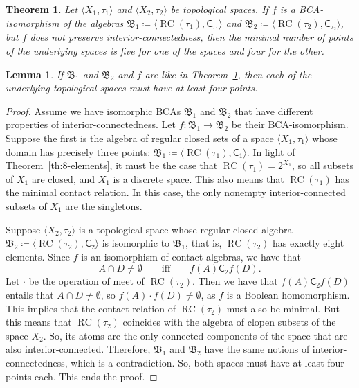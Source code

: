 \documentclass[10pt,a4paper]{amsart}
\newtheorem{theorem}{Theorem}
\newtheorem{lemma}{Lemma}
\DeclareMathOperator{\RCvtex}{RC}
\begin{document}
\begin{theorem}%
\label{th:minimality-theorem}
Let $  \langle X_{1},\tau _{1}  \rangle $ and
$  \langle X_{2},\tau _{2}  \rangle $ be topological spaces. If
$f$ is a BCA-isomorphism of the algebras
$\mathfrak{B}_{1}\coloneqq   \langle \RCvtex (\tau _{1}),\mathord{
\mathrel{\mathsf{C}}_{\tau _{1}}}  \rangle $ and
$\mathfrak{B}_{2}\coloneqq   \langle \RCvtex (\tau _{2}),\mathord{
\mathrel{\mathsf{C}}_{\tau _{2}}}  \rangle $, but $f$ does not preserve
interior-connectedness, then the minimal number of points of the underlying
spaces is five for one of the spaces and four for the other.
\end{theorem}

\begin{lemma}%
\label{lem:4-points}
If $\mathfrak{B}_{1}$ and $\mathfrak{B}_{2}$ and $f$ are like in Theorem~\ref{th:minimality-theorem},
then each of the underlying topological spaces must have at least four
points.
\end{lemma}

\begin{proof}
Assume we have isomorphic BCAs $\mathfrak{B}_{1}$ and
$\mathfrak{B}_{2}$ that have different properties of interior-connectedness.
Let $f\colon \mathfrak{B}_{1}\to \mathfrak{B}_{2}$ be their BCA-isomorphism.
Suppose the first is the algebra of regular closed sets of a space
$\langle X_{1},\tau _{1}\rangle $ whose domain has precisely three points:
$\mathfrak{B}_{1}\coloneqq   \langle \RCvtex (\tau _{1}),\mathrel{
\mathsf{C}}_{1}  \rangle $. In light of Theorem~\ref{th:8-elements},
it must be the case that $\RCvtex (\tau _{1})=2^{X_{1}}$, so all subsets of
$X_{1}$ are closed, and $X_{1}$ is a discrete space. This also means that
$\RCvtex (\tau _{1})$ has the minimal contact relation. In this case, the only
nonempty interior-connected subsets of $X_{1}$ are the singletons.

Suppose $\langle X_{2},\tau _{2}\rangle $ is a topological space whose
regular closed algebra
$\mathfrak{B}_{2}\coloneqq   \langle \RCvtex (\tau _{2}),\mathord{
\mathrel{\mathsf{C}}_{2}}  \rangle $ is isomorphic to
$\mathfrak{B}_1$, that is, $\RCvtex (\tau _{2})$ has exactly eight elements.
Since $f$ is an isomorphism of contact algebras, we have that
%
\begin{equation*}
A\cap D\neq \emptyset \qquad \text{iff}\qquad f(A)\mathrel{
\mathsf{C}}_{2} f(D).
\end{equation*}
%
Let $\cdot $ be the operation of meet of $\RCvtex (\tau _{2})$. Then we have
that $f(A)\mathrel{\mathsf{C}}_{2} f(D)$ entails that
$A\cap D\neq \emptyset $, so $f(A)\cdot f(D)\neq \emptyset $, as $f$ is
a Boolean homomorphism. This implies that the contact relation of
$\RCvtex (\tau _{2})$ must also be minimal. But this means that
$\RCvtex (\tau _{2})$ coincides with the algebra of clopen subsets of the space
$X_{2}$. So, its atoms are the only connected components of the space that
are also interior-connected. Therefore, $\mathfrak{B}_{1}$ and
$\mathfrak{B}_{2}$ have the same notions of interior-connectedness, which
is a contradiction. So, both spaces must have at least four points each.
This ends the proof.
\end{proof}
\end{document}
